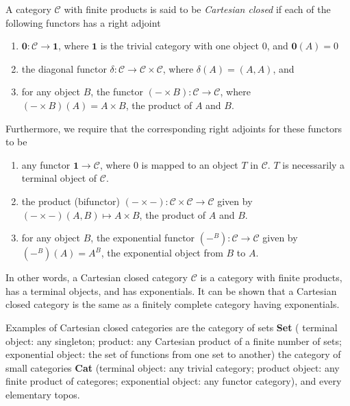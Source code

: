 A category $\mathcal{C}$ with finite products is said to be \emph{Cartesian closed} if each of the following functors has a right adjoint
\begin{enumerate}
\item $\textbf{0}:\mathcal{C}\to \textbf{1}$, where $\textbf{1}$ is the trivial category with one object $0$, and $\textbf{0}(A)=0$
\item the diagonal functor $\delta: \mathcal{C}\to \mathcal{C}\times\mathcal{C}$, where $\delta(A)=(A,A)$, and
\item for any object $B$, the functor $(-\times B):\mathcal{C}\to\mathcal{C}$, where $(-\times B)(A)=A\times B$, the product of $A$ and $B$.
\end{enumerate}
Furthermore, we require that the corresponding right adjoints for these functors to be
\begin{enumerate}
\item any functor $\textbf{1}\to\mathcal{C}$, where $0$ is mapped to an object $T$ in $\mathcal{C}$.  $T$ is necessarily a terminal object of $\mathcal{C}$.  
\item the product (bifunctor) $(-\times -): \mathcal{C} \times \mathcal{C}\to \mathcal{C}$ given by $(-\times -)(A,B)\mapsto A\times B$, the product of $A$ and $B$.
\item for any object $B$, the exponential functor $(-^B):\mathcal{C}\to\mathcal{C}$ given by $(-^B)(A)=A^B$, the exponential object from $B$ to $A$.
\end{enumerate}

In other words, a Cartesian closed category $\mathcal{C}$ is a category with finite products, has a terminal objects, and has exponentials.  It can be shown that a Cartesian closed category is the same as a finitely complete category having exponentials.

Examples of Cartesian closed categories are the category of sets \textbf{Set} ( terminal object: any singleton; product: any Cartesian product of a finite number of sets; exponential object: the set of functions from one set to another)  the category of small categories \textbf{Cat} (terminal object: any trivial category; product object: any finite product of categores; exponential object: any functor category), and every elementary topos.